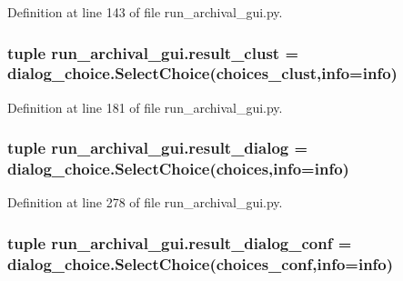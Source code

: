Definition at line 143 of file run\-\_\-archival\-\_\-gui.\-py.

\hypertarget{namespacerun__archival__gui_a06b1db0dac381a36a3d08d53e32cef14}{
\subsubsection[{result\-\_\-clust}]{\setlength{\rightskip}{0pt plus 5cm}tuple run\-\_\-archival\-\_\-gui.\-result\-\_\-clust = dialog\-\_\-choice.\-Select\-Choice({\bf choices\-\_\-clust},{\bf info}={\bf info})}}\label{namespacerun__archival__gui_a06b1db0dac381a36a3d08d53e32cef14}


Definition at line 181 of file run\-\_\-archival\-\_\-gui.\-py.

\hypertarget{namespacerun__archival__gui_a8150e0f3711f1ecc9f609f017904320c}{
\subsubsection[{result\-\_\-dialog}]{\setlength{\rightskip}{0pt plus 5cm}tuple run\-\_\-archival\-\_\-gui.\-result\-\_\-dialog = dialog\-\_\-choice.\-Select\-Choice({\bf choices},{\bf info}={\bf info})}}\label{namespacerun__archival__gui_a8150e0f3711f1ecc9f609f017904320c}


Definition at line 278 of file run\-\_\-archival\-\_\-gui.\-py.

\hypertarget{namespacerun__archival__gui_aee5d9d725a2d81626f709acca7420a84}{
\subsubsection[{result\-\_\-dialog\-\_\-conf}]{\setlength{\rightskip}{0pt plus 5cm}tuple run\-\_\-archival\-\_\-gui.\-result\-\_\-dialog\-\_\-conf = dialog\-\_\-choice.\-Select\-Choice({\bf choices\-\_\-conf},{\bf info}={\bf info})}}\label{namespacerun__archival__gui_aee5d9d725a2d81626f709acca7420a84}



